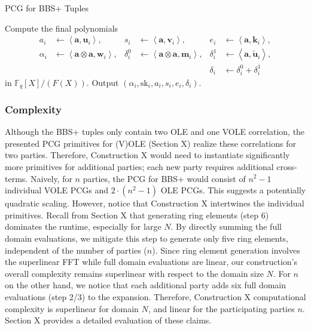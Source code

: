 \begin{specialconstruction}{PCG for BBS+ Tuples}
\begin{algorithmic}[1]
\State Compute the final polynomials
\begin{align*}
a_{i} & \leftarrow \left\langle\boldsymbol{a}, \boldsymbol{u}_{i}\right\rangle, & 
s_{i} & \leftarrow \left\langle\boldsymbol{a}, \boldsymbol{v}_{i}\right\rangle, &
e_{i} & \leftarrow \left\langle\boldsymbol{a}, \boldsymbol{k}_{i}\right\rangle, \\
\alpha_{i} & \leftarrow \left\langle\boldsymbol{a} \otimes \boldsymbol{a},  \boldsymbol{w}_{i}\right\rangle, & 
\delta_{i}^{0} & \leftarrow \left\langle\boldsymbol{a} \otimes \boldsymbol{a},  \boldsymbol{m}_{i}\right\rangle, & 
\delta_{i}^{1} & \leftarrow \left\langle\boldsymbol{a},  \widetilde{\boldsymbol{u}}_{i}\right\rangle, \\
& & & & \delta_{i} & \leftarrow \delta_{i}^{0} + \delta_{i}^{1}
\end{align*}
in $\mathbb{F}_{q}[X] / (F(X))$. Output $\left(\alpha_{i}, \mathrm{sk}_{i}, a_{i}, s_{i}, e_{i}, \delta_{i}\right)$.
\end{algorithmic}
\end{specialconstruction}



\subsubsection{Complexity}
Although the BBS+ tuples only contain two OLE and one VOLE correlation, the presented PCG primitives for (V)OLE (Section X) realize these correlations for two parties. Therefore, Construction X would need to instantiate significantly more primitives for additional parties; each new party requires additional cross-terms. Naively, for $n$ parties, the PCG for BBS+ would consist of $n^2-1$ individual VOLE PCGs and $2\cdot(n^2-1)$ OLE PCGs. This suggests a potentially quadratic scaling. However, notice that Construction X intertwines the individual primitives. Recall from Section X that generating ring elements (step 6) dominates the runtime, especially for large $N$. By directly summing the full domain evaluations, we mitigate this step to generate only five ring elements, independent of the number of parties ($n$). Since ring element generation involves the superlinear FFT while full domain evaluations are linear, our construction's overall complexity remains superlinear with respect to the domain size $N$. For $n$ on the other hand, we notice that each additional party adds six full domain evaluations (step 2/3) to the expansion. Therefore, Construction X computational complexity is superlinear for domain $N$, and linear for the participating parties $n$. Section X provides a detailed evaluation of these claims.

